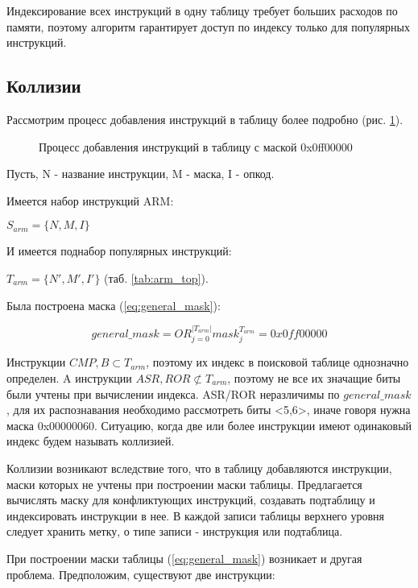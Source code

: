 Индексирование всех инструкций в одну таблицу требует больших расходов по памяти, поэтому алгоритм гарантирует доступ по индексу только для популярных инструкций.

 \subsection{Коллизии}
 
 Рассмотрим процесс добавления инструкций в таблицу более подробно (рис. \ref{img:add_opcode_sheme}).
 
 \begin{figure}[h!] \label{img:add_opcode}
    \caption{Процесс добавления инструкций в таблицу с маской 0x0ff00000}
    \label{img:add_opcode_sheme}
\end{figure}

Пусть, N - название инструкции, M - маска, I - опкод.

Имеется набор инструкций ARM: 

$S_{arm}=\{N, M, I\}$

И имеется поднабор популярных инструкций:

 $T_{arm}=\{N', M', I'\}$ (таб. \ref{tab:arm_top}).
 
Была построена маска (\ref{eq:general_mask}):

\begin{equation*}
	general\_mask=OR_{j=0}^{|T_{arm}|}mask_j^{T_{arm}} = 0x0ff00000
\end{equation*}

Инструкции $CMP,B \subset T_{arm}$, поэтому их индекс в поисковой таблице однозначно определен. A инструкции $ASR, ROR \not \subset T_{arm}$, поэтому не все их значащие биты были учтены при вычислении индекса. ASR/ROR неразличимы по $general\_mask$, для их распознавания необходимо рассмотреть биты <5,6>, иначе говоря нужна маска 0x00000060. Ситуацию, когда две или более инструкции имеют одинаковый индекс будем называть коллизией. 

Коллизии возникают вследствие того, что в таблицу добавляются инструкции, маски которых не учтены при построении маски таблицы. Предлагается вычислять маску для конфликтующих инструкций, создавать подтаблицу и индексировать инструкции в нее. В каждой записи таблицы верхнего уровня следует хранить метку, о типе записи - инструкция или подтаблица.

При построении маски таблицы (\ref{eq:general_mask}) возникает и другая проблема. Предположим, существуют две инструкции: 

